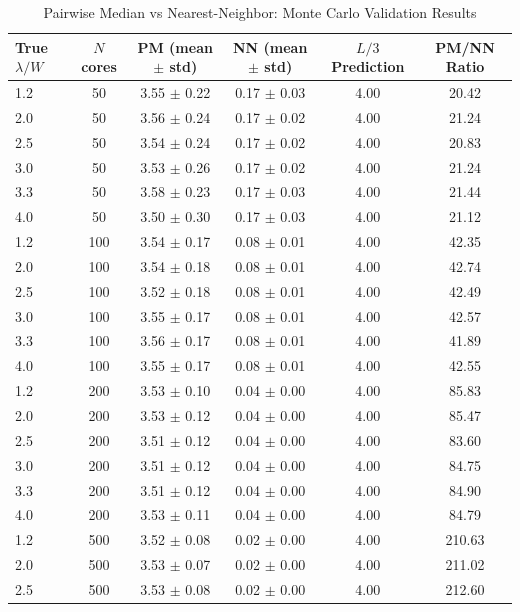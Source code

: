 
\begin{table}
\caption{Pairwise Median vs Nearest-Neighbor: Monte Carlo Validation Results}
\label{tab:pm_nn_validation}
\begin{tabular}{lccccc}
\toprule
True $\lambda/W$ & $N$ cores & PM (mean $\pm$ std) & NN (mean $\pm$ std) & $L/3$ Prediction & PM/NN Ratio \\
\midrule
1.2 &   50 & 3.55 $\pm$ 0.22 & 0.17 $\pm$ 0.03 & 4.00 & 20.42 \\
2.0 &   50 & 3.56 $\pm$ 0.24 & 0.17 $\pm$ 0.02 & 4.00 & 21.24 \\
2.5 &   50 & 3.54 $\pm$ 0.24 & 0.17 $\pm$ 0.02 & 4.00 & 20.83 \\
3.0 &   50 & 3.53 $\pm$ 0.26 & 0.17 $\pm$ 0.02 & 4.00 & 21.24 \\
3.3 &   50 & 3.58 $\pm$ 0.23 & 0.17 $\pm$ 0.03 & 4.00 & 21.44 \\
4.0 &   50 & 3.50 $\pm$ 0.30 & 0.17 $\pm$ 0.03 & 4.00 & 21.12 \\
1.2 &  100 & 3.54 $\pm$ 0.17 & 0.08 $\pm$ 0.01 & 4.00 & 42.35 \\
2.0 &  100 & 3.54 $\pm$ 0.18 & 0.08 $\pm$ 0.01 & 4.00 & 42.74 \\
2.5 &  100 & 3.52 $\pm$ 0.18 & 0.08 $\pm$ 0.01 & 4.00 & 42.49 \\
3.0 &  100 & 3.55 $\pm$ 0.17 & 0.08 $\pm$ 0.01 & 4.00 & 42.57 \\
3.3 &  100 & 3.56 $\pm$ 0.17 & 0.08 $\pm$ 0.01 & 4.00 & 41.89 \\
4.0 &  100 & 3.55 $\pm$ 0.17 & 0.08 $\pm$ 0.01 & 4.00 & 42.55 \\
1.2 &  200 & 3.53 $\pm$ 0.10 & 0.04 $\pm$ 0.00 & 4.00 & 85.83 \\
2.0 &  200 & 3.53 $\pm$ 0.12 & 0.04 $\pm$ 0.00 & 4.00 & 85.47 \\
2.5 &  200 & 3.51 $\pm$ 0.12 & 0.04 $\pm$ 0.00 & 4.00 & 83.60 \\
3.0 &  200 & 3.51 $\pm$ 0.12 & 0.04 $\pm$ 0.00 & 4.00 & 84.75 \\
3.3 &  200 & 3.51 $\pm$ 0.12 & 0.04 $\pm$ 0.00 & 4.00 & 84.90 \\
4.0 &  200 & 3.53 $\pm$ 0.11 & 0.04 $\pm$ 0.00 & 4.00 & 84.79 \\
\midrule
1.2 &  500 & 3.52 $\pm$ 0.08 & 0.02 $\pm$ 0.00 & 4.00 & 210.63 \\
2.0 &  500 & 3.53 $\pm$ 0.07 & 0.02 $\pm$ 0.00 & 4.00 & 211.02 \\
2.5 &  500 & 3.53 $\pm$ 0.08 & 0.02 $\pm$ 0.00 & 4.00 & 212.60 \\

\end{tabular}
\end{table}
